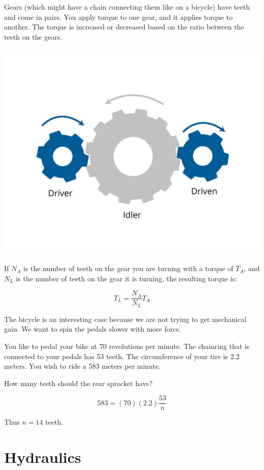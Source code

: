 Gears (which might have a chain connecting them like on a bicycle)
have teeth and come in pairs. You apply torque to one gear, and it
applies torque to another. The torque is increased or decreased based
on the ratio between the teeth on the gears.


\includegraphics[width=.7\textwidth]{gearsNew.png}


If $N_A$ is the number of teeth on the gear you are turning with a
torque of $T_A$, and $N_L$ is the number of teeth on the gear it is
turning, the resulting torque is:

$$T_L = \frac{N_A}{N_L} T_A$$


\begin{Exercise}[title={Gears}, label=gear]

The bicycle is an interesting case because we are not trying to get
mechanical gain. We want to spin the pedals slower with more force.

You like to pedal your bike at 70 revolutions per minute. The
chainring that is connected to your pedals has 53 teeth. The
circumference of your tire is 2.2 meters. You wish to ride a 583 meters
per minute.

How many teeth should the rear sprocket have?

\end{Exercise}
\begin{Answer}[ref=ramp]

  $$583 = (70)(2.2)\frac{53}{n}$$


Thus $n = 14$ teeth.
\end{Answer}



\section{Hydraulics}

